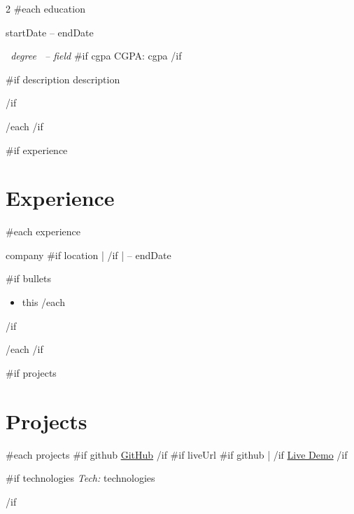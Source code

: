 \documentclass[10pt,a4paper]{article}
\begin{document}
\begin{paracol}{2}
{{#each education}}
\textbf{ }
\par

{\small\color{muted}
{{startDate}} -- {{endDate}}
}
\par

\textit{ {{~degree~}} -- {{field}} }
{{#if cgpa}}
\hfill {\small CGPA: {{cgpa}} }
{{/if}}
\par

{{#if description}}
{{description}}
\par
{{/if}}

\vspace{3pt}
{{/each}}
{{/if}}

{{#if experience}}
\section{Experience}

{{#each experience}}
\textbf{ }
\par

{\small\color{muted}
{{company}}
{{#if location}}
\enspace | 
{{/if}}
\enspace |  -- {{endDate}}
}
\par

{{#if bullets}}
\begin{itemize}
    {{#each bullets}}
    \item {{this}}
    {{/each}}
\end{itemize}
{{/if}}

\vspace{2pt}
{{/each}}
{{/if}}

{{#if projects}}
\section{Projects}

{{#each projects}}
\textbf{ }
\hfill
{\small
{{#if github}}
\href{ {{~github~}} }{GitHub}
{{/if}}
{{#if liveUrl}}
{{#if github}}
\enspace | \enspace
{{/if}}
\href{ {{~liveUrl~}} }{Live Demo}
{{/if}}
}
\par

{{#if technologies}}
{\small\color{muted}
\textit{Tech:} {{technologies}}
}
\par
{{/if}}


\end{paracol}
\end{document}
